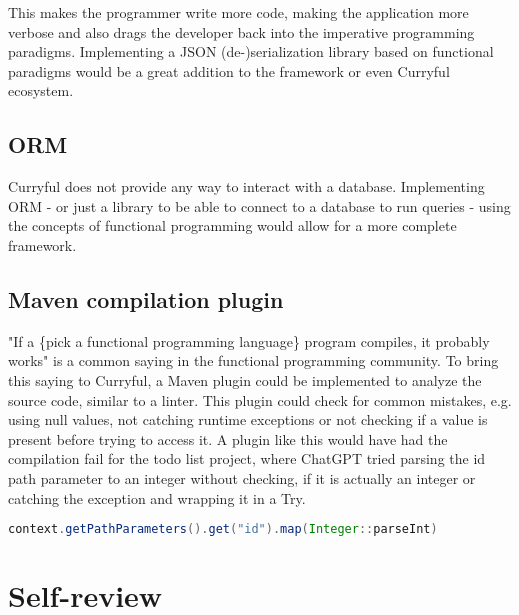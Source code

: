\documentclass[a4paper,titlepage]{article}
\begin{document}
\noindent This makes the programmer write more code, making the application more
verbose and also drags the developer back into the imperative programming
paradigms. Implementing a JSON (de-)serialization library based on functional
paradigms would be a great addition to the framework or even Curryful ecosystem.

\subsection{ORM}
Curryful does not provide any way to interact with a database. Implementing ORM
- or just a library to be able to connect to a database to run queries - using
the concepts of functional programming would allow for a more complete
framework.

\subsection{Maven compilation plugin}
"If a \{pick a functional programming language\} program compiles, it probably
works" is a common saying in the functional programming community. To bring this
saying to Curryful, a Maven plugin could be implemented to analyze the source
code, similar to a linter. This plugin could check for common mistakes, e.g.
using null values, not catching runtime exceptions or not checking if a value
is present before trying to access it. A plugin like this would have had the
compilation fail for the todo list project, where ChatGPT tried parsing the id
path parameter to an integer without checking, if it is actually an integer or
catching the exception and wrapping it in a Try.\newline

\begin{lstlisting}[language=Java, caption=ChatGPT generated code that would have
		had compilation fail using the before conceptuailzed plugin,
		captionpos=b, label=lst:curryful-parse-error]
context.getPathParameters().get("id").map(Integer::parseInt)
\end{lstlisting}

\section{Self-review}

\newpage
\listoffigures

\newpage
\lstlistoflistings

\newpage
\listoftables

\newpage

\end{document}
